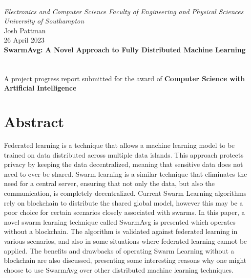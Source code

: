 \documentclass[12pt,a4paper]{report}
\author{Josh Pattman}
\begin{document}
	
	\begin{titlepage}
		\textcolor{white}{.}\\[2.2cm]
		\centering\Large\emph{Electronics and Computer Science Faculty of Engineering and Physical Sciences University of Southampton}
		\\[2cm]
		\centering\Large{Josh Pattman} \\
		\centering\Large{26 April 2023} \\
		\centering\huge\textbf{SwarmAvg: A Novel Approach to Fully Distributed Machine Learning}
		\\[2cm]
		 \\[1cm]
		\\[2cm]
		\centering\Large{A project progress report submitted for the award of \textbf{Computer Science with Artificial Intelligence}}
	\end{titlepage}
	
	\chapter*{Abstract}
	Federated learning is a technique that allows a machine learning model to be trained on data distributed across multiple data islands. This approach protects privacy by keeping the data decentralized, meaning that sensitive data does not need to ever be shared. Swarm learning is a similar technique that eliminates the need for a central server, ensuring that not only the data, but also the communication, is completely decentralized. Current Swarm Learning algorithms rely on blockchain to distribute the shared global model, however this may be a poor choice for certain scenarios closely associated with swarms. In this paper, a novel swarm learning technique called SwarmAvg is presented which operates without a blockchain. The algorithm is validated against federated learning in various scenarios, and also in some situations where federated learning cannot be applied. The benefits and drawbacks of operating Swarm Learning without a blockchain are also discussed, presenting some interesting reasons why one might choose to use SwarmAvg over other distributed machine learning techniques.
	
\end{document}
